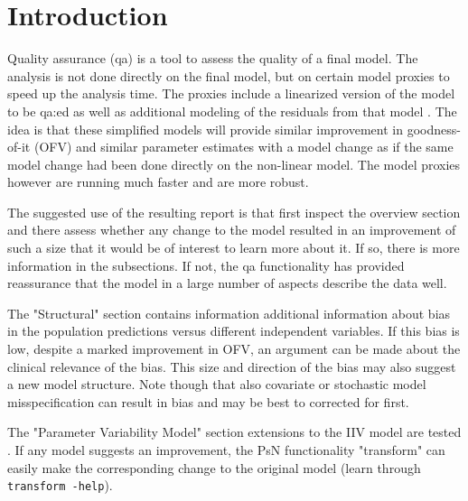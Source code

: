 

\usepackage{hyperref}


\maketitle
\newcommand{\guidetoolname}{qa}
\tableofcontents
\newpage


\section{Introduction}
Quality assurance (qa) is a tool to assess the quality of a final model. The analysis is not done directly on the final model, but on certain model proxies to speed up the analysis time.
The proxies include a linearized version of the model to be qa:ed as well as additional modeling of the residuals from that model \cite{Khandelwal, Svensson, Ibrahim}. The idea is that these simplified models will provide similar improvement in goodness-of-it (OFV) and similar parameter estimates with a model change as if the same model change had been done directly on the non-linear model. The model proxies however are running much faster and are more robust. 

The suggested use of the resulting report is that first inspect the overview section and there assess whether any change to the model resulted in an improvement of such a size that it would be of interest to learn more about it. If so, there is more information in the subsections. If not, the qa functionality has provided reassurance that the model in a large number of aspects describe the data well. 

The "Structural" section contains information additional information about bias in the population predictions\cite{Ibrahim3} versus different independent variables.  If this bias is low, despite a marked improvement in OFV, an argument can be made about the clinical relevance of the bias. This size and direction of the bias may also suggest a new model structure. Note though that also covariate or stochastic model misspecification can result in bias and may be best to corrected for first. 

The "Parameter Variability Model" section extensions to the IIV model are tested \cite{Svensson, Petersson}. If any model suggests an improvement, the PsN functionality "transform" can easily make the corresponding change to the original model (learn through \verb|transform -help|).


